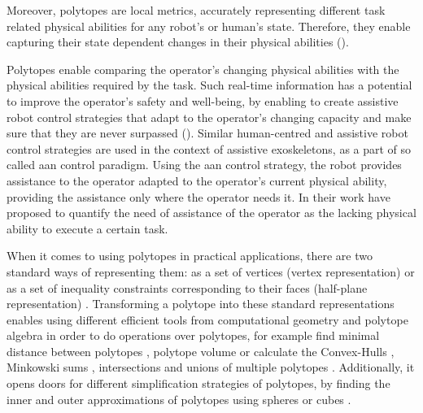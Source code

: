 Moreover, polytopes are local metrics, accurately representing different task related physical abilities for any robot's or human's state. Therefore, they enable capturing their state dependent changes in their physical abilities ().

Polytopes enable comparing the operator's changing physical abilities with the physical abilities required by the task. Such real-time information has a potential to improve the operator's safety and well-being, by enabling to create assistive robot control strategies that adapt to the operator's changing capacity and make sure that they are never surpassed (). 
Similar human-centred and assistive robot control strategies are used in the context of assistive exoskeletons, as a part of so called \gls{aan} \cite{carmichael2013admittance} control paradigm. Using the \gls{aan} control strategy, the robot provides assistance to the operator adapted to the operator's current physical ability, providing the assistance only where the operator needs it. In their work \citet{carmichael_towards_2011} have proposed to quantify the need of assistance of the operator as the lacking physical ability to execute a certain task.



When it comes to using polytopes in practical applications, there are two standard ways of representing them: as a set of vertices (vertex representation) or as a set of inequality constraints corresponding to their faces (half-plane representation) \cite{fukuda2004frequently}. Transforming a polytope into these standard representations enables using different efficient tools from computational geometry and polytope algebra in order to do operations over polytopes, for example find minimal distance between polytopes \cite{Ong1997gjk}, polytope volume \cite{Lawrence1991Volume} or calculate the Convex-Hulls \cite{Barber1996}, Minkowski sums \cite{BARKI2009525}, intersections and unions of multiple polytopes \cite{Tiwary2008}. Additionally, it opens doors for different simplification strategies of polytopes, by finding the inner and outer approximations of polytopes using spheres \cite{Botkin1994} or cubes \cite{BEMPORAD2004151}.

